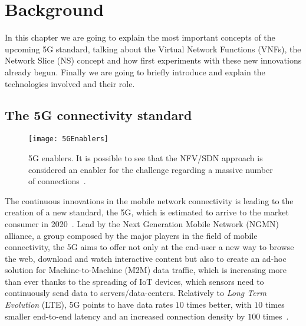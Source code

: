\chapter{Background}
\label{chap:background}

In this chapter we are going to explain the most important concepts of the
upcoming 5G standard, talking about the Virtual Network Functions (VNFs), the
Network Slice (NS) concept and how first experiments with these new innovations
already begun. Finally we are going to briefly introduce and explain the
technologies involved and their role.

\section{The 5G connectivity standard}

\begin{figure}[t]
  \centering
  \texttt{[image: 5GEnablers]}
  \caption[5G enablers]{5G enablers. It is possible to see that the NFV/SDN
    approach is considered an enabler for the challenge regarding a massive
    number of connections~\cite{agyapong2014design}.}
  \label{chap:background:sec:5G:img:enablers}
\end{figure}

The continuous innovations in the mobile network connectivity is leading to the
creation of a new standard, the 5G, which is estimated to arrive to the market
consumer in 2020~\cite{iwamura2015ngmn}. Lead by the Next Generation Mobile
Network (NGMN) alliance, a group composed by the major players in the field of
mobile connectivity, the 5G aims to offer not only at the end-user a new way to
browse the web, download and watch interactive content but also to create an
ad-hoc solution for Machine-to-Machine (M2M) data traffic, which is increasing
more than ever thanks to the spreading of IoT devices, which sensors need to
continuously send data to servers/data-centers. Relatively to \emph{Long Term
  Evolution} (LTE), 5G points to have data rates $10$ times better, with $10$
times smaller end-to-end latency and an increased connection density by $100$
times~\cite{alliance20155g}.

